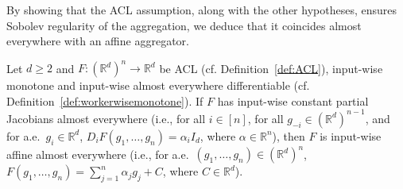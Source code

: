 \documentclass[twoside,11pt]{article}
\newcommand{\R}{\mathbb{R}}
\begin{document}
By showing that the ACL assumption, along with the other hypotheses, ensures Sobolev regularity of the aggregation, we deduce that it coincides almost everywhere with an affine aggregator.

\begin{lemma}\label{lem:ACL-equal-ae}
  Let $d \geq 2$ and $F: (\R^d)^n \to \R^d$ be ACL (cf. Definition~\ref{def:ACL}), input-wise monotone and input-wise almost everywhere differentiable (cf. Definition~\ref{def:workerwisemonotone}).
  If $F$ has input-wise constant partial Jacobians almost everywhere (i.e., for all $i \in [n]$, for all $g_{-i} \in (\R^d)^{n-1}$, and for a.e.\ $g_i \in \R^d$, $D_i F(g_1, \ldots, g_n) = \alpha_i I_d$, where $\alpha \in \R^n$),
  then $F$ is input-wise affine almost everywhere (i.e., for a.e.\ $(g_1, \ldots, g_n) \in (\mathbb{R}^d)^n$, $F(g_1, \ldots, g_n) = \sum_{j=1}^n \alpha_j g_j + C$, where $C\in\R^d$).
\end{lemma}
\end{document}
